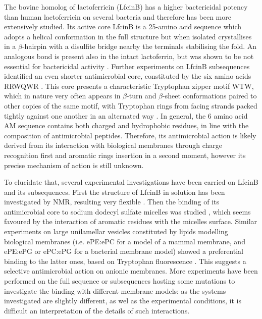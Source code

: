 The bovine homolog of lactoferricin (LfcinB) has a higher bactericidal potency than human lactoferricin on several bacteria \cite{Cochran2001} and therefore has been more extensively studied. Its active core LfcinB is a 25-amino acid sequence which adopts a helical conformation in the full structure but when isolated crystallises in a $\beta$-hairpin with a disulfite bridge nearby the terminals stabilising the fold. An analogous bond is present also in the intact lactoferrin, but was shown to be not essential for bactericidal activity \cite{Cochran2001}.
%
Further experiments on LfcinB subsequences identified an even shorter antimicrobial core, constituted by the six amino acids RRWQWR \cite{Schibli1999}. This core presents a characteristic Tryptophan zipper motif WTW, which in nature very often appears in $\beta$-turn and $\beta$-sheet conformations paired to other copies of the same motif, with Tryptophan rings from facing strands packed tightly against one another in an alternated way \cite{Cochran2001}.
In general, the 6 amino acid AM sequence contains both charged and hydrophobic residues, in line with the composition of antimicrobial peptides. Therefore, its antimicrobial action is likely derived from its interaction with biological membranes through charge recognition first and aromatic rings insertion in a second moment, however its precise mechanism of action is still unknown.

To elucidate that, several experimental investigations have been carried on LfcinB and its subsequences. First the structure of LfcinB in solution has been investigated by NMR, resulting very flexible \cite{Hwang1998}. Then the binding of its antimicrobial core to sodium dodecyl sulfate micelles was studied \cite{Schibli1999}, which seems favoured by the interaction of aromatic residues with the micelles surface.
%
Similar experiments on large unilamellar vesicles constituted by lipids modelling biological membranes (i.e. ePE:ePC for a model of a mammal membrane, and ePE:ePG or ePC:ePG for a bacterial membrane model)  showed a preferential binding to the latter ones, based on Tryptophan fluorescence \cite{Nguyen2005}. This suggests a selective antimicrobial action on anionic membranes.
%
More experiments have been performed on the full sequence or subsequences hosting some mutations \cite{Tsutsumi2012,Arseneault2010} to investigate the binding with different membrane models: as the systems investigated are slightly different, as wel as the experimental conditions, it is difficult an interpretation of the details of such interactions.

